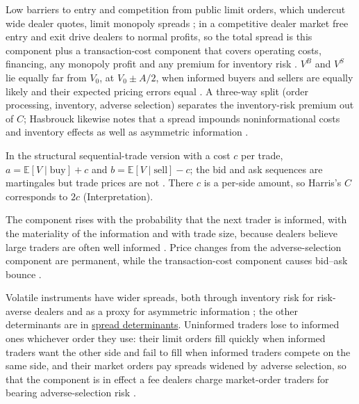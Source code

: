 \begin{qfresult}
Low barriers to entry and competition from public limit orders, which undercut wide dealer quotes, limit monopoly spreads \citep[same chap., p.~298]{alpha-harris}; in a competitive dealer market free entry and exit drive dealers to normal profits, so the total spread is this component plus a transaction-cost component that covers operating costs, financing, any monopoly profit and any premium for inventory risk \citep[same chap., pp.~298--299]{alpha-harris}. $V^B$ and $V^S$ lie equally far from $V_0$, at $V_0\pm A/2$, when informed buyers and sellers are equally likely and their expected pricing errors equal \citep[same chap., p.~301]{alpha-harris}. A three-way split (order processing, inventory, adverse selection) separates the inventory-risk premium out of $C$; Hasbrouck likewise notes that a spread impounds noninformational costs and inventory effects as well as asymmetric information \citep[sec.~5.5, p.~53]{s6-hasbrouck}.

In the structural sequential-trade version with a cost $c$ per trade, $a=\mathbb{E}[V\mid\text{buy}]+c$ and $b=\mathbb{E}[V\mid\text{sell}]-c$; the bid and ask sequences are martingales but trade prices are not \citep[sec.~5.4.2, p.~49]{s6-hasbrouck}. There $c$ is a per-side amount, so Harris's $C$ corresponds to $2c$ (Interpretation).

 The component rises with the probability that the next trader is informed, with the materiality of the information and with trade size, because dealers believe large traders are often well informed \citep[chap.~``Dealers'', pp.~289--291 and~295]{alpha-harris}. Price changes from the adverse-selection component are permanent, while the transaction-cost component causes bid--ask bounce \citep[chap.~``Bid/Ask Spreads'', pp.~299--300]{alpha-harris}.

Volatile instruments have wider spreads, both through inventory risk for risk-averse dealers and as a proxy for asymmetric information \citep[same chap., pp.~312--313]{alpha-harris}; the other determinants are in \hyperref[res:spread-determinants]{spread determinants}. Uninformed traders lose to informed ones whichever order they use: their limit orders fill quickly when informed traders want the other side and fail to fill when informed traders compete on the same side, and their market orders pay spreads widened by adverse selection, so that the component is in effect a fee dealers charge market-order traders for bearing adverse-selection risk \citep[same chap., sec.~14.3, pp.~303--304, Table~14-1]{alpha-harris}.


\end{qfresult}
